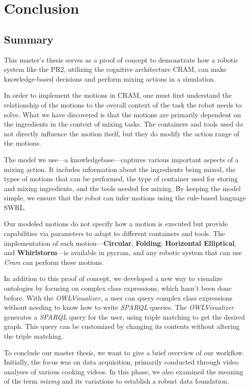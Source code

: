 \chapter{Conclusion}
\label{chap:conclusion}

\section{Summary}
This master's thesis serves as a proof of concept to demonstrate how a robotic system like the PR2, utilizing the cognitive architecture CRAM, can make knowledge-based decisions and perform mixing actions in a simulation.

In order to implement the motions in CRAM, one must first understand the relationship of the motions to the overall context of the task the robot needs to solve. What we have discovered is that the motions are primarily dependent on the ingredients in the context of mixing tasks. The containers and tools used do not directly influence the motion itself, but they do modify the action range of the motions.

The model we use—a knowledgebase—captures various important aspects of a mixing action. It includes information about the ingredients being mixed, the types of motions that can be performed, the type of container used for storing and mixing ingredients, and the tools needed for mixing. By keeping the model simple, we ensure that the robot can infer motions using the rule-based language SWRL.

Our modeled motions do not specify how a motion is executed but provide capabilities via parameters to adapt to different containers and tools. The implementation of each motion—\textbf{Circular}, \textbf{Folding}, \textbf{Horizontal Elliptical}, and \textbf{Whirlstorm}—is available in pycram, and any robotic system that can use \textit{Cram} can perform these motions.

In addition to this proof of concept, we developed a new way to visualize ontologies by focusing on complex class expressions, which hasn't been done before. With the \textit{OWLVisualizer}, a user can query complex class expressions without needing to know how to write \textit{SPARQL} queries. The \textit{OWLVisualizer} generates a \textit{SPARQL} query for the user, using triple matching to get the desired graph. This query can be customized by changing its contents without altering the triple matching.


To conclude our master thesis, we want to give a brief overview of our workflow.
Initially, the focus was on data acquisition, primarily conducted through video analyses of various cooking videos. In this phase, we also examined the meaning of the term \textit{mixing} and its variations to establish a robust data foundation.

